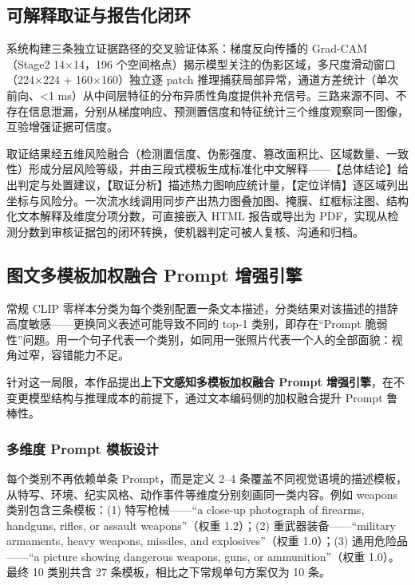 \documentclass[UTF8, a4paper, 12pt]{ctexart}
\begin{document}
\subsection{可解释取证与报告化闭环}

系统构建三条独立证据路径的交叉验证体系：梯度反向传播的 Grad-CAM（Stage2 14×14，196 个空间格点）揭示模型关注的伪影区域，多尺度滑动窗口（224×224 + 160×160）独立逐 patch 推理捕获局部异常，通道方差统计（单次前向、<1 ms）从中间层特征的分布异质性角度提供补充信号。三路来源不同、不存在信息泄漏，分别从梯度响应、预测置信度和特征统计三个维度观察同一图像，互验增强证据可信度。

取证结果经五维风险融合（检测置信度、伪影强度、篡改面积比、区域数量、一致性）形成分层风险等级，并由三段式模板生成标准化中文解释——【总体结论】给出判定与处置建议，【取证分析】描述热力图响应统计量，【定位详情】逐区域列出坐标与风险分。一次流水线调用同步产出热力图叠加图、掩膜、红框标注图、结构化文本解释及维度分项分数，可直接嵌入 HTML 报告或导出为 PDF，实现从检测分数到审核证据包的闭环转换，使机器判定可被人复核、沟通和归档。

\subsection{图文多模板加权融合 Prompt 增强引擎}
\label{sec:innovation-prompt-ensemble}

常规 CLIP 零样本分类为每个类别配置一条文本描述，分类结果对该描述的措辞高度敏感——更换同义表述可能导致不同的 top-1 类别，即存在“Prompt 脆弱性”问题。用一个句子代表一个类别，如同用一张照片代表一个人的全部面貌：视角过窄，容错能力不足。

针对这一局限，本作品提出\textbf{上下文感知多模板加权融合 Prompt 增强引擎}，在不变更模型结构与推理成本的前提下，通过文本编码侧的加权融合提升 Prompt 鲁棒性。

\subsubsection{多维度 Prompt 模板设计}

每个类别不再依赖单条 Prompt，而是定义 2--4 条覆盖不同视觉语境的描述模板，从特写、环境、纪实风格、动作事件等维度分别刻画同一类内容。例如 weapons 类别包含三条模板：(1) 特写枪械——“a close-up photograph of firearms, handguns, rifles, or assault weapons”（权重 1.2）；(2) 重武器装备——“military armaments, heavy weapons, missiles, and explosives”（权重 1.0）；(3) 通用危险品——“a picture showing dangerous weapons, guns, or ammunition”（权重 1.0）。最终 10 类别共含 27 条模板，相比之下常规单句方案仅为 10 条。
\end{document}
